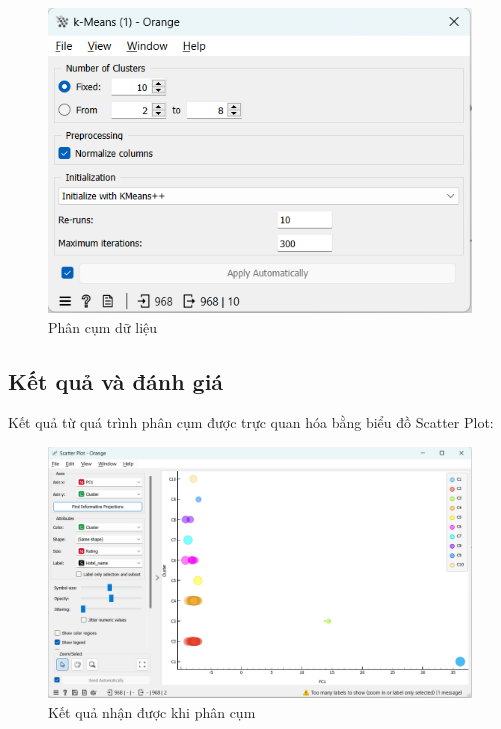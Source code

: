 \begin{figure}[H]
    \centering
    \includegraphics[width=0.6\linewidth]{Figures/10.12.png}
    \caption{Phân cụm dữ liệu}
\end{figure}

\subsection{Kết quả và đánh giá}
Kết quả từ quá trình phân cụm được trực quan hóa bằng biểu đồ Scatter Plot:

\begin{figure}[H]
    \centering
    \includegraphics[width=1\linewidth]{Figures/10.13.png}
    \caption{Kết quả nhận được khi phân cụm}
\end{figure}


